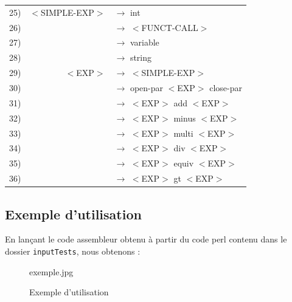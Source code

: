 \documentclass[a4paper,10pt]{article}
\begin{document}
\begin{tabular}{rrl}
25)&$<$SIMPLE-EXP$>$	& $\rightarrow$ int \\
26)&					& $\rightarrow$ $<$FUNCT-CALL$>$ \\
27)&					& $\rightarrow$ variable \\
28)&					& $\rightarrow$ string \\				

29)&$<$EXP$>$			& $\rightarrow$ $<$SIMPLE-EXP$>$   \\
30)&					& $\rightarrow$ open-par $<$EXP$>$ close-par\\ 
31)&					& $\rightarrow$ $<$EXP$>$ add $<$EXP$>$ \\
32)&					& $\rightarrow$ $<$EXP$>$ minus $<$EXP$>$ \\
33)&					& $\rightarrow$ $<$EXP$>$ multi $<$EXP$>$ \\
34)&					& $\rightarrow$ $<$EXP$>$ div $<$EXP$>$ \\
35)&					& $\rightarrow$ $<$EXP$>$ equiv $<$EXP$>$ \\
36)&					& $\rightarrow$ $<$EXP$>$ gt $<$EXP$>$ \\
					
					
\end{tabular}

\subsection{Exemple d'utilisation}
En lançant le code assembleur obtenu à partir du code perl contenu dans le dossier \verb?inputTests?, nous obtenons : 
 \begin{figure}[H] \hspace*{-2cm} 
   \centering
   	  exemple.jpg
			\caption{Exemple d'utilisation}
			\label{ExempleUtilisation}
 \end{figure}	
\end{document}
